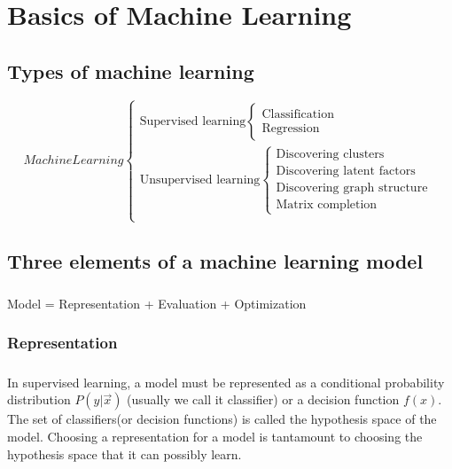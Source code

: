 \chapter{Basics of Machine Learning}

\section{Types of machine learning}


\begin{equation}\nonumber
Machine Learning 
\begin{cases}
\text{Supervised learning} 
\begin{cases} 
\text{Classification} \\ 
\text{Regression} 
\end{cases}\\
\text{Unsupervised learning} 
\begin{cases}
\text{Discovering clusters} \\ 
\text{Discovering latent factors} \\ 
\text{Discovering graph structure} \\ 
\text{Matrix completion} 
\end{cases}\\
\end{cases}
\end{equation}


\section{Three elements of a machine learning model}
\paragraph{}Model = Representation + Evaluation + Optimization

\subsection{Representation}
\paragraph{}In supervised learning, a model must be represented as a conditional probability distribution $P(y|\vec{x})$ (usually we call it classifier) or a decision function $f(x)$. The set of classifiers(or decision functions) is called the hypothesis space of the model. Choosing a representation for a model is tantamount to choosing the hypothesis space that it can possibly learn. 


